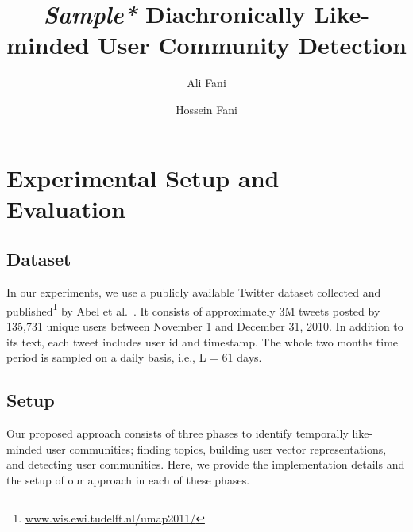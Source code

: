 \documentclass[sigconf]{acmart}
\begin{document}
\title{\textit{Sample*} Diachronically Like-minded User Community Detection}
\author{Ali Fani}
\author{Hossein Fani}

\maketitle
\section{Experimental Setup and Evaluation}\label{experiment}

\subsection{Dataset}
In our experiments, we use a publicly available Twitter dataset collected and published\footnote{\href{http://www.wis.ewi.tudelft.nl/umap2011/}{www.wis.ewi.tudelft.nl/umap2011/}} by Abel et al.~\cite{DBLP:conf/um/AbelGHT11}. It consists of approximately 3M tweets posted by 135,731 unique users between November 1 and December 31, 2010. In addition to its text, each tweet includes user id and timestamp. The whole two months time period is sampled on a daily basis, i.e., L = 61 days.

\subsection{Setup}
Our proposed approach consists of three phases to identify temporally like-minded user communities; finding topics, building user vector representations, and detecting user communities. Here, we provide the implementation details and the setup of our approach in each of these phases. 
\end{document}
